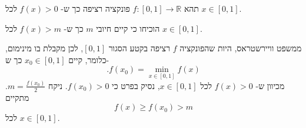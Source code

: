 תהא
$f:[0,1]\longrightarrow\mathbb{R}$
פונקציה רציפה כך ש-
$f(x)>0$
לכל
$x\in[0,1]$.

הוכיחו כי קיים חיובי
$m$
כך ש-
$f(x)>m$
לכל
$x\in[0,1]$.
\begin{solbox}
ממשפט וויירשטראס, היות שהפונקציה
$f$
רציפה בקטע הסגור
$[0,1]$,
לכן מקבלת בו מינימום, כלומר,
קיים
$x_0\in[0,1]$
כך ש-
$$.f(x_0)=\displaystyle\min_{x\in[0,1]}f(x)$$
מכיוון ש-
$f(x)>0$
לכל
$x\in[0,1]$,
נסיק בפרט כי
$f(x_0)>0$.
ניקח
$m=\frac{f(x_0)}{2}$.
מתקיים
$$f(x)\geq f(x_0)>m$$
לכל
$x\in[0,1]$.
\end{solbox}
